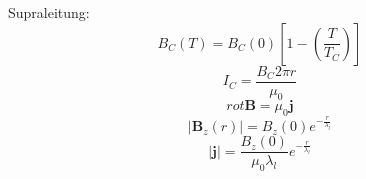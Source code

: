 \documentclass[11pt]{article}
\begin{document}
Supraleitung:
\begin{equation}
  B_C(T)=B_C(0)\left[1-\left(\frac{T}{T_C}\right)\right]
\end{equation}
\begin{equation}
  I_C=\frac{B_C2\pi r}{\mu_0}
\end{equation}
\begin{equation}
  rot\bm{B}=\mu_0\bm{j}
\end{equation}
\begin{equation}
  \left|\bm{B}_z(r)\right|=B_z(0)e^{-\frac{r}{\lambda_l}}
\end{equation}
\begin{equation}
  \left|\bm{j}\right|=\frac{B_z(0)}{\mu_0\lambda_l}e^{-\frac{r}{\lambda_l}}
\end{equation}
\end{document}
